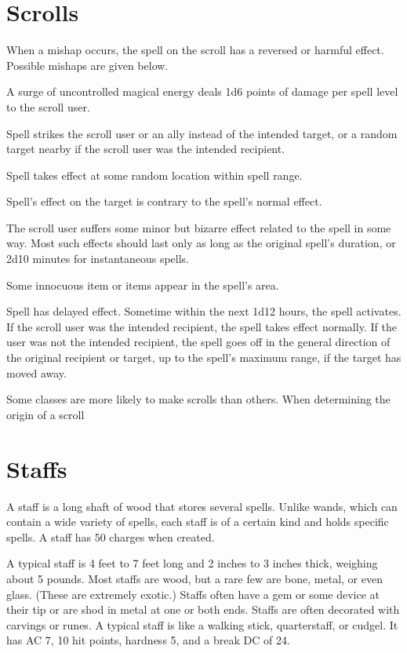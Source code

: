 \section{Scrolls}

 When a mishap occurs, the spell on the scroll has a reversed or harmful effect. Possible mishaps are given below.
\begin{itemize*}
\item A surge of uncontrolled magical energy deals 1d6 points of damage per spell level to the scroll user.
\item Spell strikes the scroll user or an ally instead of the intended target, or a random target nearby if the scroll user was the intended recipient.
\item Spell takes effect at some random location within spell range.
\item Spell's effect on the target is contrary to the spell's normal effect.
\item The scroll user suffers some minor but bizarre effect related to the spell in some way. Most such effects should last only as long as the original spell's duration, or 2d10 minutes for instantaneous spells.
\item Some innocuous item or items appear in the spell's area.
\item Spell has delayed effect. Sometime within the next 1d12 hours, the spell activates. If the scroll user was the intended recipient, the spell takes effect normally. If the user was not the intended recipient, the spell goes off in the general direction of the original recipient or target, up to the spell's maximum range, if the target has moved away.
\end{itemize*}

 Some classes are more likely to make scrolls than others. When determining the origin of a scroll

\section{Staffs}

A staff is a long shaft of wood that stores several spells. Unlike wands, which can contain a wide variety of spells, each staff is of a certain kind and holds specific spells. A staff has 50 charges when created.

 A typical staff is 4 feet to 7 feet long and 2 inches to 3 inches thick, weighing about 5 pounds. Most staffs are wood, but a rare few are bone, metal, or even glass. (These are extremely exotic.) Staffs often have a gem or some device at their tip or are shod in metal at one or both ends. Staffs are often decorated with carvings or runes. A typical staff is like a walking stick, quarterstaff, or cudgel. It has AC 7, 10 hit points, hardness 5, and a break DC of 24.

